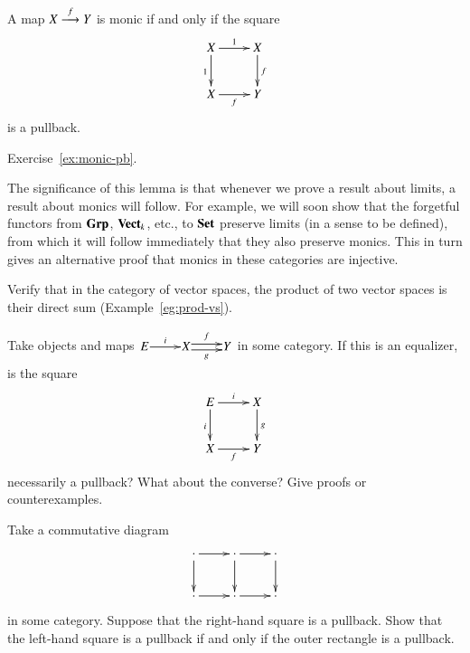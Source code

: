 \begin{lemma}
\label{lemma:monic-pb}
A map $X \stackrel{f}{\longrightarrow} Y$ is monic if and only if the square
\[
\xymatrix{
X \ar[r]^1 \ar[d]_1     &X \ar[d]^f     \\
X \ar[r]_f              &Y
}
\]
is a pullback.
\end{lemma}

\begin{pf}
Exercise~\ref{ex:monic-pb}.
\end{pf}

The significance of this lemma is that whenever we prove a result about
limits, a result about monics will follow.  For example, we will soon show
that the forgetful functors from $\mathbf{Grp}$, $\mathbf{Vect}_k$, etc., to $\mathbf{Set}$
preserve limits (in a sense to be defined), from which it will follow
immediately that they also preserve monics.  This in turn gives an
alternative proof that monics in these categories are injective.


\exs


\begin{question}
\label{ex:prod-vs}
Verify that in the category of vector spaces, the product of two vector
spaces is their direct sum (Example~\ref{eg:prod-vs}).
\end{question}


\begin{question}
Take objects and maps $\xymatrix@1{E \ar[r]^i &X \ar@<.5ex>[r]^{f}
\ar@<-.5ex>[r]_g &Y}$ in some category.  If this is an equalizer, is the
square
\[
\xymatrix{
E \ar[r]^i \ar[d]_i     &
X \ar[d]^g      \\
X \ar[r]_f      &
Y
}
\]
necessarily a pullback?%
%
%
%
What about the converse?  Give proofs or counterexamples.
\end{question}


\begin{question}
\label{ex:pb-pasting}
Take a commutative diagram
\[
\xymatrix{
\cdot \ar[r] \ar[d]     &
\cdot \ar[r] \ar[d]     &
\cdot \ar[d]    \\
\cdot \ar[r]    &
\cdot \ar[r]    &
\cdot
}
%
\index{pullback!pasting of pullbacks}
%
\]
in some category.  Suppose that the right-hand square is a pullback.  Show
that the left-hand square is a pullback if and only if the outer rectangle is
a pullback.
\end{question}


